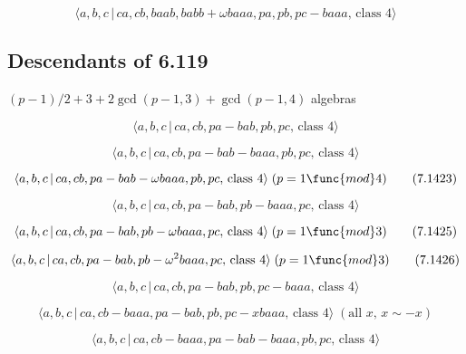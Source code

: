 \documentclass[10pt]{article}
\begin{document}
\begin{equation}
\langle a,b,c\,|\,ca,cb,baab,babb+\omega baaa,pa,pb,pc-baaa,\,\text{class }%
4\rangle  \tag{7.1420}
\end{equation}

\subsection{Descendants of 6.119}

$(p-1)/2+3+2\gcd (p-1,3)+\gcd (p-1,4)$ algebras

\begin{equation}
\langle a,b,c\,|\,ca,cb,pa-bab,pb,pc,\,\text{class }4\rangle  \tag{7.1421}
\end{equation}

\begin{equation}
\langle a,b,c\,|\,ca,cb,pa-bab-baaa,pb,pc,\,\text{class }4\rangle 
\tag{7.1422}
\end{equation}

\begin{equation}
\langle a,b,c\,|\,ca,cb,pa-bab-\omega baaa,pb,pc,\,\text{class }4\rangle
\;(p=1\func{mod}4)  \tag{7.1423}
\end{equation}

\begin{equation}
\langle a,b,c\,|\,ca,cb,pa-bab,pb-baaa,pc,\,\text{class }4\rangle 
\tag{7.1424}
\end{equation}

\begin{equation}
\langle a,b,c\,|\,ca,cb,pa-bab,pb-\omega baaa,pc,\,\text{class }4\rangle
\;(p=1\func{mod}3)  \tag{7.1425}
\end{equation}

\begin{equation}
\langle a,b,c\,|\,ca,cb,pa-bab,pb-\omega ^{2}baaa,pc,\,\text{class }4\rangle
\;(p=1\func{mod}3)  \tag{7.1426}
\end{equation}

\begin{equation}
\langle a,b,c\,|\,ca,cb,pa-bab,pb,pc-baaa,\,\text{class }4\rangle 
\tag{7.1427}
\end{equation}

\begin{equation}
\langle a,b,c\,|\,ca,cb-baaa,pa-bab,pb,pc-xbaaa,\,\text{class }4\rangle \;(%
\text{all }x,\,x\sim -x)  \tag{7.1428}
\end{equation}

\begin{equation}
\langle a,b,c\,|\,ca,cb-baaa,pa-bab-baaa,pb,pc,\,\text{class }4\rangle 
\tag{7.1429}
\end{equation}
\end{document}
